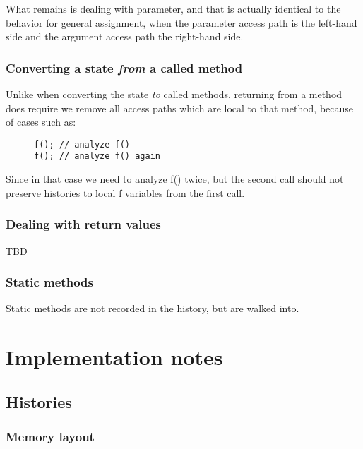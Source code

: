 \documentclass{article}
\begin{document}
What remains is dealing with parameter, and that is actually identical to the behavior for general assignment, when the parameter access path is the left-hand side and the argument access path the right-hand side.

\subsubsection{Converting a state \emph{from} a called method}

Unlike when converting the state \emph{to} called methods, returning from a method does require we remove all access paths which are local to that method, because of cases such as:

\begin{figure}[h]
	\begin{lstlisting}
f(); // analyze f()
f(); // analyze f() again
	\end{lstlisting}
\end{figure}

Since in that case we need to analyze f() twice, but the second call should not preserve histories to local f variables from the first call.

\subsubsection{Dealing with return values}

TBD %

\subsubsection{Static methods}

Static methods are not recorded in the history, but are walked into.

\section{Implementation notes}

\subsection{Histories}

\subsubsection{Memory layout}
\end{document}
